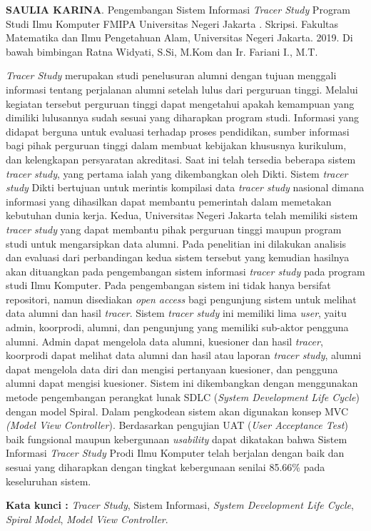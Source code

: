 \documentclass{jtetiskripsi}
\begin{document}
\begin{abstractind}
\textbf{SAULIA KARINA}. Pengembangan Sistem Informasi \textit{Tracer Study} Program Studi Ilmu Komputer FMIPA Universitas Negeri Jakarta . Skripsi. Fakultas Matematika dan Ilmu Pengetahuan Alam, Universitas Negeri Jakarta. 2019. Di bawah bimbingan Ratna Widyati, S.Si, M.Kom dan Ir. Fariani I., M.T.
\vskip1cm

\textit{Tracer Study} merupakan studi penelusuran alumni dengan tujuan menggali informasi tentang perjalanan alumni setelah lulus dari perguruan tinggi. Melalui kegiatan tersebut perguruan tinggi dapat mengetahui apakah kemampuan yang dimiliki lulusannya sudah sesuai yang diharapkan program studi. Informasi yang didapat berguna untuk evaluasi terhadap proses pendidikan, sumber informasi bagi pihak perguruan tinggi dalam membuat kebijakan khususnya kurikulum, dan kelengkapan persyaratan akreditasi. Saat ini telah tersedia beberapa sistem \textit{tracer study}, yang pertama ialah yang dikembangkan oleh Dikti. Sistem \textit{tracer study} Dikti bertujuan untuk merintis kompilasi data \textit{tracer study} nasional dimana informasi yang dihasilkan dapat membantu pemerintah dalam memetakan kebutuhan dunia kerja. Kedua, Universitas Negeri Jakarta telah memiliki sistem \textit{tracer study} yang dapat membantu pihak perguruan tinggi maupun program studi untuk mengarsipkan data alumni. Pada penelitian ini dilakukan analisis dan evaluasi dari perbandingan kedua sistem tersebut yang kemudian hasilnya akan dituangkan pada pengembangan sistem informasi \textit{tracer study} pada program studi Ilmu Komputer. Pada pengembangan sistem ini tidak hanya bersifat repositori, namun disediakan \textit{open access} bagi pengunjung sistem untuk melihat data alumni dan hasil \textit{tracer}. Sistem \textit{tracer study} ini memiliki lima \textit{user}, yaitu admin, koorprodi, alumni, dan pengunjung yang memiliki sub-aktor pengguna alumni. Admin dapat mengelola data alumni, kuesioner dan hasil \textit{tracer}, koorprodi dapat melihat data alumni dan hasil atau laporan \textit{tracer study}, alumni dapat mengelola data diri dan mengisi pertanyaan kuesioner, dan pengguna alumni dapat mengisi kuesioner. Sistem ini dikembangkan dengan menggunakan metode pengembangan perangkat lunak SDLC (\textit{System Development Life Cycle}) dengan model Spiral. Dalam pengkodean sistem akan digunakan konsep MVC \textit{(Model View Controller}). Berdasarkan pengujian UAT (\textit{User Acceptance Test}) baik fungsional maupun kebergunaan \textit{usability} dapat dikatakan bahwa Sistem Informasi \textit{Tracer Study} Prodi Ilmu Komputer telah berjalan dengan baik dan sesuai yang diharapkan dengan tingkat kebergunaan senilai 85.66\% pada keseluruhan sistem. 


\bigskip
\noindent
\textbf{Kata kunci :} \textit{Tracer Study}, Sistem Informasi, \textit{System Development Life Cycle}, \textit{Spiral Model}, \textit{Model View Controller}.

\end{abstractind}
\end{document}
